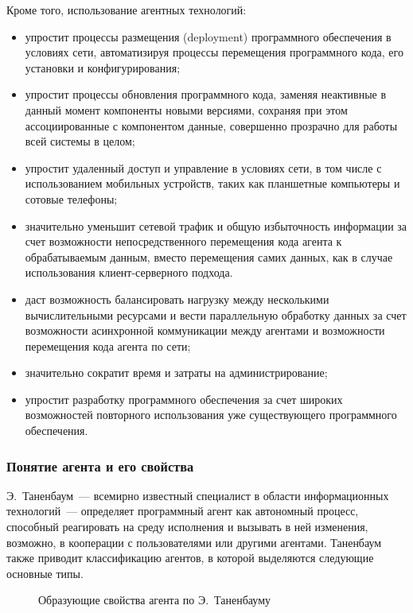 Кроме того, использование агентных технологий:
\begin{itemize}
\item упростит процессы размещения (deployment) программного обеспечения в условиях сети, автоматизируя процессы перемещения программного кода, его установки и конфигурирования;
\item упростит процессы обновления программного кода, заменяя неактивные в данный момент компоненты новыми версиями, сохраняя при этом ассоциированные с компонентом данные, совершенно прозрачно для работы всей системы в целом;
\item упростит удаленный доступ и управление в условиях сети, в том числе с использованием мобильных устройств, таких как планшетные компьютеры и сотовые телефоны;
\item значительно уменьшит сетевой трафик и общую избыточность информации за счет возможности непосредственного перемещения кода агента к обрабатываемым данным, вместо перемещения самих данных, как в случае использования клиент-серверного подхода.
\item даст возможность балансировать нагрузку между несколькими вычислительными ресурсами и вести параллельную обработку данных за счет возможности асинхронной коммуникации между агентами и возможности перемещения кода агента по сети;
\item значительно сократит время и затраты на администрирование;
\item упростит разработку программного обеспечения за счет широких возможностей повторного использования уже существующего программного обеспечения.
\end{itemize}

\subsubsection{Понятие агента и его свойства}
Э.~Таненбаум~--- всемирно известный специалист в области информационных технологий~--- определяет программный агент как автономный процесс, способный реагировать на среду исполнения и вызывать в ней изменения, возможно, в кооперации с пользователями или другими агентами. Таненбаум также приводит классификацию агентов, в которой выделяются следующие основные типы.
\begin{figure}[h]
\caption{Образующие свойства агента по Э.~Таненбауму}
\label{1:tanenbaum-agent}
\end{figure}

